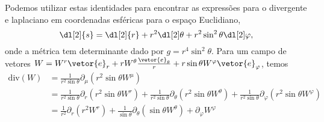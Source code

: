 Podemos utilizar estas identidades para encontrar as expressões para o divergente e laplaciano em coordenadas esféricas para o espaço Euclidiano,
\begin{equation*}
    \dl[2]{s} = \dl[2]{r} + r^2\dl[2]\theta + r^2 \sin^2\theta\dl[2]\varphi,
\end{equation*}
onde a métrica tem determinante dado por \(g = r^4 \sin^2\theta.\)
Para um campo de vetores \(W = W^r \vetor{e}_r + rW^\theta \frac{\vetor{e}_\theta}{r} + r\sin\theta W^\varphi \vetor{e}_\varphi\), temos
\begin{align*}
    \mathrm{div}(W) &= \frac1{r^2 \sin\theta}\partial_\mu\left(r^2\sin\theta W^\mu\right)\\
                    &= \frac{1}{r^2\sin\theta}\partial_r\left(r^2 \sin\theta W^r\right) +\frac{1}{r^2\sin\theta}\partial_\theta\left(r^2 \sin\theta W^\theta\right) +\frac{1}{r^2\sin\theta}\partial_\varphi\left(r^2 \sin\theta W^\varphi\right)\\
                    &= \frac{1}{r^2}\partial_r \left(r^2 W^r\right) + \frac{1}{\sin\theta}\partial_\theta\left(\sin\theta W^\theta\right) + \partial_\varphi W^\varphi
\end{align*}
